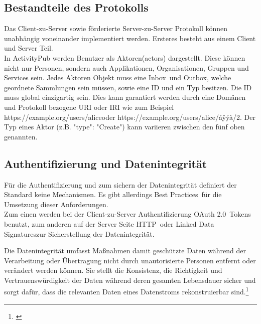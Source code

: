 	\subsection{Bestandteile des Protokolls}
		Das Client-zu-Server sowie förderierte Server-zu-Server Protokoll können unabhängig voneinander implementiert werden. Ersteres besteht aus einem Client und Server Teil.\\
		
		In ActivityPub werden Benutzer als \glqq Aktoren\grqq(actors) dargestellt. Diese können nicht nur Personen, sondern auch Applikationen, Organisationen, Gruppen und Services sein\cite{activityStreamsCore}. Jedes Aktoren Objekt muss eine \glqq Inbox\grqq~und \glqq Outbox\grqq, welche geordnete Sammlungen sein müssen, sowie eine ID und ein Typ besitzen\cite{activityPub}. Die ID muss global einzigartig sein. Dies kann garantiert werden durch eine Domänen und Protokoll bezogene URI oder IRI wie zum Beispiel \glqq https://example.org/users/alice\grqq oder \glqq https://example.org/users/alice/áŷýà/2\grqq. %
		Der Typ eines Aktor (z.B. "type": "Create") kann variieren zwischen den fünf oben genannten.
		
		
	
	\subsection{Authentifizierung und Datenintegrität}
		Für die Authentifizierung und zum sichern der Datenintegrität definiert der Standard keine Mechanismen. Es gibt allerdings \glqq Best Practices\grqq~für die Umsetzung dieser Anforderungen.\\
		
		Zum einen werden bei der Client-zu-Server Authentifizierung \glqq OAuth 2.0\grqq~Tokens benutzt, zum anderen auf der Server Seite \glqq HTTP\grqq~oder \glqq Linked Data Signatures\grqq zur Sicherstellung der Datenintegrität.\\
		
		
		\glqq Die Datenintegrität umfasst Maßnahmen damit geschützte Daten während der Verarbeitung oder Übertragung nicht durch unautorisierte Personen entfernt oder verändert werden können. Sie stellt die Konsistenz, die Richtigkeit und Vertrauenswürdigkeit der Daten während deren gesamten Lebensdauer sicher und sorgt dafür, dass die relevanten Daten eines Datenstroms rekonstruierbar sind.\grqq\footnote{\cite{data-integrity}}
		

